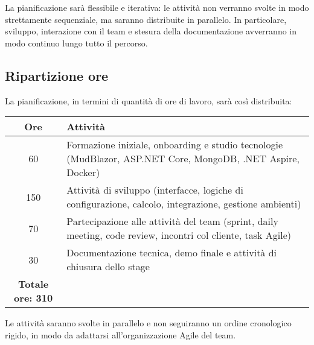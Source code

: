 La pianificazione sarà flessibile e iterativa: le attività non verranno svolte in modo strettamente sequenziale, ma saranno distribuite in parallelo. In particolare, sviluppo, interazione con il team e stesura della documentazione avverranno in modo continuo lungo tutto il percorso.

\newpage

\subsection*{Ripartizione ore}

La pianificazione, in termini di quantità di ore di lavoro, sarà così distribuita:

\begin{center}
\begin{tabular}{|c|p{10cm}|}
    \hline
    \textbf{Ore} & \textbf{Attività} \\
    \hline
    60 & Formazione iniziale, onboarding e studio tecnologie (MudBlazor, ASP.NET Core, MongoDB, .NET Aspire, Docker) \\
    \hline
    150 & Attività di sviluppo (interfacce, logiche di configurazione, calcolo, integrazione, gestione ambienti) \\
    \hline
    70 & Partecipazione alle attività del team (sprint, daily meeting, code review, incontri col cliente, task Agile) \\
    \hline
    30 & Documentazione tecnica, demo finale e attività di chiusura dello stage \\
    \hline
    \textbf{Totale ore: 310} & \\
    \hline
\end{tabular}
\end{center}

Le attività saranno svolte in parallelo e non seguiranno un ordine cronologico rigido, in modo da adattarsi all’organizzazione Agile del team.

\newpage
